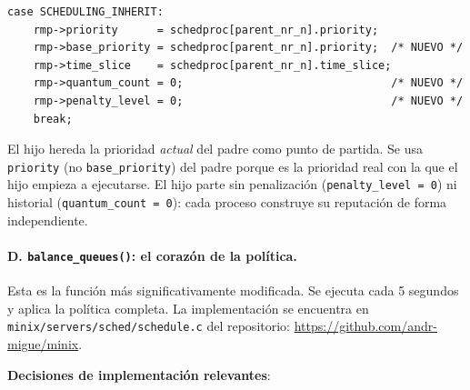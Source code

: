 \documentclass[11pt,a4paper]{article}
\begin{document}
\begin{lstlisting}[style=cstyle,caption={Inicializaci\'on en rama \texttt{SCHEDULING\_INHERIT}}]
case SCHEDULING_INHERIT:
    rmp->priority      = schedproc[parent_nr_n].priority;
    rmp->base_priority = schedproc[parent_nr_n].priority;  /* NUEVO */
    rmp->time_slice    = schedproc[parent_nr_n].time_slice;
    rmp->quantum_count = 0;                                /* NUEVO */
    rmp->penalty_level = 0;                                /* NUEVO */
    break;
\end{lstlisting}

El hijo hereda la prioridad \emph{actual} del padre como punto de partida. Se usa \texttt{priority} (no \texttt{base\_priority}) del padre porque es la prioridad real con la que el hijo empieza a ejecutarse. El hijo parte sin penalizaci\'on (\texttt{penalty\_level = 0}) ni historial (\texttt{quantum\_count = 0}): cada proceso construye su reputaci\'on de forma independiente.

\paragraph{D. \texttt{balance\_queues()}: el coraz\'on de la pol\'itica.}

Esta es la funci\'on m\'as significativamente modificada. Se ejecuta cada 5 segundos y aplica la pol\'itica completa. La implementaci\'on se encuentra en \texttt{minix/servers/sched/schedule.c} del repositorio: \url{https://github.com/andr-migue/minix}.


\textbf{Decisiones de implementaci\'on relevantes}:
\end{document}

